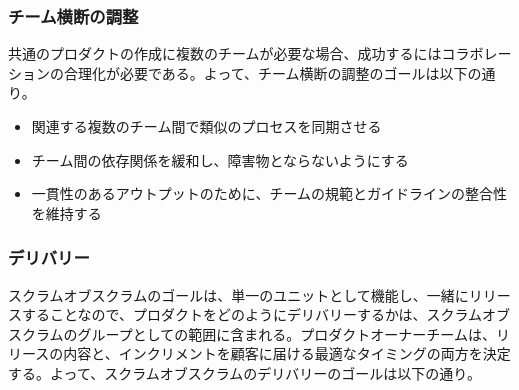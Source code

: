 \documentclass[12pt,a4paper,parskip=full]{scrartcl}
\begin{document}

\subsubsection{チーム横断の調整}\label{cross-team-coordination}

共通のプロダクトの作成に複数のチームが必要な場合、成功するにはコラボレーションの合理化が必要である。よって、チーム横断の調整のゴールは以下の通り。

\begin{itemize}
\itemsep1pt\parskip0pt

\item
関連する複数のチーム間で類似のプロセスを同期させる
\item
チーム間の依存関係を緩和し、障害物とならないようにする
\item
一貫性のあるアウトプットのために、チームの規範とガイドラインの整合性を維持する
\end{itemize}

\subsubsection{デリバリー}\label{Delivery}

スクラムオブスクラムのゴールは、単一のユニットとして機能し、一緒にリリースすることなので、プロダクトをどのようにデリバリーするかは、スクラムオブスクラムのグループとしての範囲に含まれる。プロダクトオーナーチームは、リリースの内容と、インクリメントを顧客に届ける最適なタイミングの両方を決定する。よって、スクラムオブスクラムのデリバリーのゴールは以下の通り。
\end{document}
